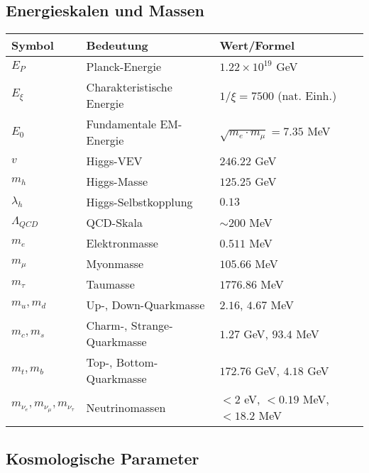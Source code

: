 \documentclass[12pt,a4paper]{article}
\begin{document}
	\subsection{Energieskalen und Massen}
	
	\begin{longtable}{lll}
		\toprule
		\textbf{Symbol} & \textbf{Bedeutung} & \textbf{Wert/Formel} \\
		\midrule
		$E_P$ & Planck-Energie & $1.22 \times 10^{19}$ GeV \\
		$E_\xi$ & Charakteristische Energie & $1/\xi = 7500$ (nat. Einh.) \\
		$E_0$ & Fundamentale EM-Energie & $\sqrt{m_e \cdot m_\mu} = 7.35$ MeV \\
		$v$ & Higgs-VEV & $246.22$ GeV \\
		$m_h$ & Higgs-Masse & $125.25$ GeV \\
		$\lambda_h$ & Higgs-Selbstkopplung & $0.13$ \\
		$\Lambda_{QCD}$ & QCD-Skala & $\sim 200$ MeV \\
		$m_e$ & Elektronmasse & $0.511$ MeV \\
		$m_\mu$ & Myonmasse & $105.66$ MeV \\
		$m_\tau$ & Taumasse & $1776.86$ MeV \\
		$m_u, m_d$ & Up-, Down-Quarkmasse & $2.16$, $4.67$ MeV \\
		$m_c, m_s$ & Charm-, Strange-Quarkmasse & $1.27$ GeV, $93.4$ MeV \\
		$m_t, m_b$ & Top-, Bottom-Quarkmasse & $172.76$ GeV, $4.18$ GeV \\
		$m_{\nu_e}, m_{\nu_\mu}, m_{\nu_\tau}$ & Neutrinomassen & $< 2$ eV, $< 0.19$ MeV, $< 18.2$ MeV \\
		\bottomrule
	\end{longtable}
	
	\subsection{Kosmologische Parameter}
	
\end{document}
